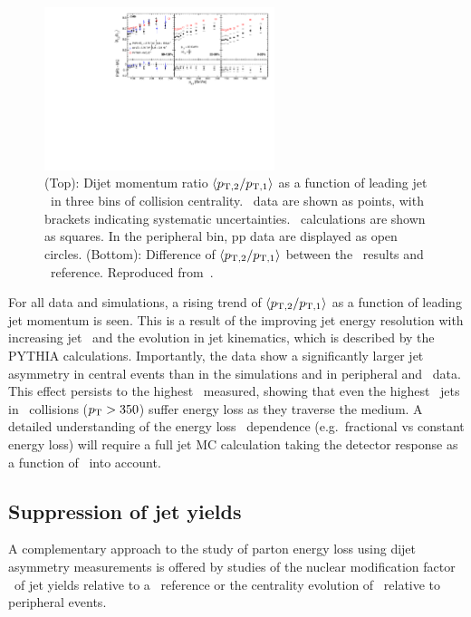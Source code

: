 \begin{figure}[!th]
\begin{center}
\includegraphics[width=0.6\textwidth]{jetfigures/deltaPtOverPt5_lead120_sub30_diff_20120103.pdf}
\caption{(Top): Dijet momentum ratio $\langle p_{\rm{T},2}/p_{\rm{T},1} \rangle$ as a function of
leading jet \pT\ in three bins of collision centrality.
\PbPb\ data are shown as points, with brackets indicating systematic uncertainties.  
\PYTHYD\ calculations are shown as squares. In the peripheral bin,
pp data are displayed as open circles.
(Bottom): Difference of $\langle p_{\rm{T},2}/p_{\rm{T},1} \rangle$ between the \PbPb\ results and \PYTHYD\ reference.
Reproduced from~\cite{CMS_dijet}.}
\label{fig:GR:CMS_pt_ratio}
\end{center}
\end{figure}

For all data and simulations, a rising trend of $\langle p_{\rm{T},2}/p_{\rm{T},1} \rangle$ as a function
of leading jet momentum is seen. This is a result of the improving jet energy resolution
with increasing jet \pT\ and the evolution in jet kinematics, which is described by the PYTHIA
calculations. Importantly, the data show a significantly larger jet asymmetry in central events
than in the simulations and in peripheral and \pp\ data. This effect persists to the
highest \pT\ measured, showing that even the highest \pT\ jets in \PbPb\ collisions ($\mbox{$p_{\mathrm{T}}$} > 350$\GeVc)
suffer energy loss as they traverse the medium. A detailed understanding of the energy loss
\pT\ dependence (e.g.\ fractional vs constant energy loss) will require a full jet MC calculation
taking the detector response as a function of \pT\ into account.

\subsection{Suppression of jet yields}

A complementary approach to the study of parton energy loss using dijet asymmetry measurements
is offered by studies of the nuclear modification factor \Raa\ of jet yields relative
to a \pp\ reference or the centrality evolution of \Rcp\ relative to peripheral events.

